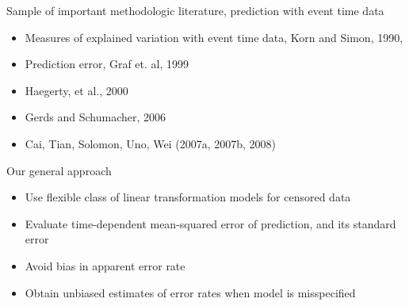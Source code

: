 \documentclass[11pt]{beamer}
\begin{document}
\begin{frame}{Sample of important methodologic literature,
prediction with event time data}

  \begin{itemize}

  \item Measures of explained variation with event time data, Korn
  and Simon, 1990, 
  
  \item Prediction error, Graf et. al, 1999
  
  \item Haegerty, et al., 2000 
  
  \item Gerds and Schumacher, 2006 

  \item Cai, Tian, Solomon, Uno, Wei (2007a, 2007b, 2008)

  \end{itemize}

\end{frame}


\begin{frame}{Our general approach}

\begin{itemize}

\item Use flexible class of linear transformation models for
censored data

  \item Evaluate time-dependent mean-squared error of prediction,
  and its standard error
  
  \item Avoid bias in apparent error rate

  \item Obtain unbiased estimates of error rates when model is
  misspecified

 \end{itemize}

\end{frame}
\end{document}
